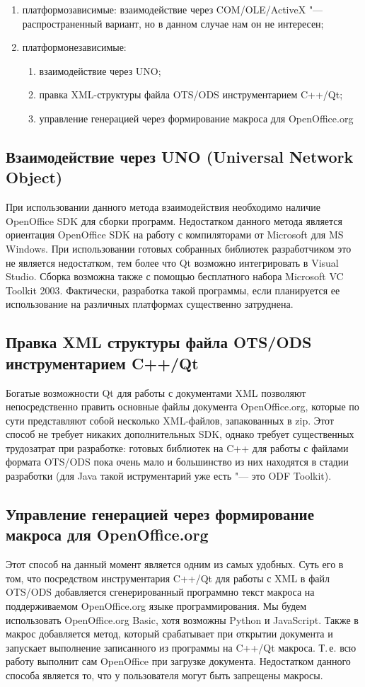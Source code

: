 \documentclass[10pt, a5paper]{article}
\begin{document}
\begin{enumerate}
\item платформозависимые: взаимодействие через COM/OLE/Ac\-tiveX "--- распространенный вариант, но в данном случае нам он не интересен;
\item платформонезависимые:
\begin{enumerate} 
\item взаимодействие через UNO;
\item правка XML-структуры файла OTS/ODS инструментарием C++/Qt;
\item управление генерацией через формирование макроса для OpenOffice.org
\end{enumerate}
\end{enumerate}

\subsection*{Взаимодействие через UNO (Universal Network Ob\-ject)}
При использовании данного метода взаимодействия необходимо наличие OpenOffice SDK для сборки программ. Недостатком данного метода является ориентация OpenOffice SDK на работу с компиляторами от Microsoft для MS Windows. При использовании готовых собранных библиотек разработчиком это не является недостатком, тем более что Qt возможно интегрировать в Visual Studio. Сборка возможна также с помощью бесплатного набора Microsoft VC Toolkit 2003. Фактически, разработка такой программы, если планируется ее использование на различных платформах существенно затруднена.

\subsection*{Правка XML структуры файла OTS/ODS инструментарием C++/Qt}
Богатые возможности Qt для работы с документами XML позволяют непосредственно править основные файлы документа Open\-Office.org, которые по сути представляют собой несколько XML-файлов, запакованных в zip. Этот способ не требует никаких дополнительных SDK, однако требует существенных трудозатрат при разработке: готовых библиотек на C++ для работы с файлами формата OTS/ODS пока очень мало и большинство из них находятся в стадии разработки (для Java такой иструментарий уже есть "--- это ODF Toolkit).

\subsection*{Управление генерацией через формирование макроса для OpenOffice.org}
Этот способ на данный момент является одним из самых удобных. Суть его в том, что посредством инструментария C++/Qt для работы с XML в файл  OTS/ODS добавляется сгенерированный программно текст макроса на поддерживаемом OpenOffice.org языке программирования. Мы будем использовать OpenOffice.org Basic, хотя возможны Python и JavaScript. Также в макрос добавляется метод, который срабатывает при открытии документа и запускает выполнение записанного из программы на C++/Qt макроса. Т.\,е. всю работу выполнит сам OpenOffice при загрузке документа. Недостатком данного способа является то, что у пользователя могут быть запрещены макросы.
\end{document}
